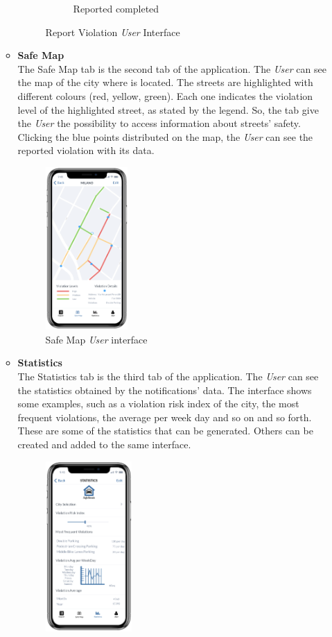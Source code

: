 \documentclass {article}
\begin{document}
\begin{itemize}
\begin{itemize}
\begin{figure}[H]
\begin{subfigure}{.4\textwidth}
				\caption{Reported completed}
			\end{subfigure}
			\caption{Report Violation {\it User} Interface}
			\end{figure}

			\item {\bf Safe Map} \\
			The Safe Map tab is the second tab of the application. The {\it User} can see the map of the city where is located. The streets are highlighted with different colours (red, yellow, green). Each one indicates the violation level of the highlighted street, as stated by the legend. So, the tab give the {\it User} the possibility to access information about streets' safety. Clicking the blue points distributed on the map, the {\it User} can see the reported violation with its data.
			\begin{figure}[H]
				\centering
				\includegraphics[height=6.2cm]{Images/Interfaces/user_map.png}
				\caption{Safe Map {\it User} interface}
			\end{figure}
			\item {\bf Statistics} \\
			The Statistics tab is the third tab of the application. The {\it User} can see the statistics obtained by the notifications' data. The interface shows some examples, such as a violation risk index of the city, the most frequent violations, the average per week day and so on and so forth. These are some of the statistics that can be generated. Others can be created and added to the same interface. 
			\begin{figure}[H]
				\centering
				\includegraphics[height=6.5cm]{Images/Interfaces/user_stats.png}

\end{figure}
\end{itemize}
\end{itemize}
\end{document}
